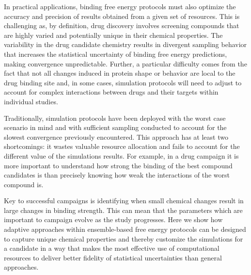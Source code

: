
In practical applications, binding free energy protocols must also optimize
the accuracy and precision of results obtained from a given set of resources.
This is challenging as, by definition, drug discovery involves screening
compounds that are highly varied and potentially unique in their chemical
properties. The variability in the drug candidate chemistry 
results in divergent sampling behavior that increases the statistical
uncertainty of binding free energy predictions, making convergence
unpredictable.
Further, a particular difficulty comes from the fact that not all changes
induced in protein shape or behavior are local to the drug binding site and,
in some cases, simulation protocols will need to adjust to account for
complex interactions between drugs and their targets within individual
studies.

Traditionally, simulation protocols have been deployed with the worst case
scenario in mind and with sufficient sampling conducted to account for the
slowest convergence previously encountered. This approach has at least two
shortcomings: it wastes valuable resource allocation and fails to account
for the different value of the simulations results. For example, in a drug
campaign it is more important to understand how strong the binding of the
best compound candidates is than precisely knowing how weak the interactions
of the worst compound is.


Key to successful campaigns is identifying when small chemical changes
result in large changes in binding strength. This can mean that the
parameters which are important to campaign evolve as the study progresses.
Here we show how adaptive approaches within ensemble-based free energy
protocols can be designed to capture unique chemical properties and thereby
customize the simulations for a candidate in a way that makes the most
effective use of computational resources to deliver better fidelity of
statistical uncertainties than general approaches.

